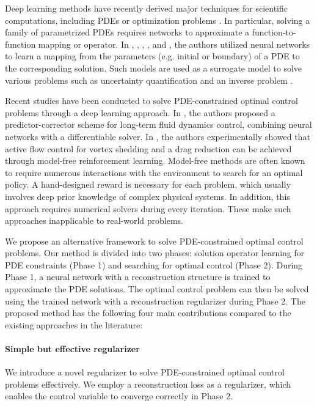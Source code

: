 \documentclass[letterpaper]{article}
\begin{document}
Deep learning methods have recently derived major techniques for scientific computations, including PDEs or optimization problems \cite{raissi2019physics}. In particular, solving a family of parametrized PDEs requires networks to approximate a function-to-function mapping or operator. In \cite{li2020fourier}, \cite{li2020neural}, \cite{lu2019deeponet}, \cite{ zhu2018bayesian}, and \cite{zhu2019physics}, the authors utilized neural networks to learn a mapping from the parameters (e.g. initial or boundary) of a PDE to the corresponding solution. Such models are used as a surrogate model to solve various problems such as uncertainty quantification \cite{zhu2018bayesian,zhu2019physics} and an inverse problem \cite{li2020fourier}.

Recent studies have been conducted to solve PDE-constrained optimal control problems through a deep learning approach. In \cite{holl2020learning}, the authors proposed a predictor-corrector scheme for long-term fluid dynamics control, combining neural networks with a differentiable solver. In \cite{rabault2019artificial}, the authors experimentally showed that active flow control for vortex shedding and a drag reduction can be achieved through model-free reinforcement learning. Model-free methods are often known to require numerous interactions with the environment to search for an optimal policy. A hand-designed reward is necessary for each problem, which usually involves deep prior knowledge of complex physical systems. In addition, this approach requires numerical solvers during every iteration. These make such approaches inapplicable to real-world problems. 

We propose an alternative framework to solve PDE-constrained optimal control problems. Our method is divided into two phases: solution operator learning for PDE constraints (Phase 1) and searching for optimal control (Phase 2). During Phase 1, a neural network with a reconstruction structure is trained to approximate the PDE solutions. The optimal control problem can then be solved using the trained network with a reconstruction regularizer during Phase 2.
 The proposed method has the following four main contributions compared to the existing approaches in the literature:

\paragraph{Simple but effective regularizer}We introduce a novel regularizer to solve PDE-constrained optimal control problems effectively. We employ a reconstruction loss as a regularizer, which enables the control variable to converge correctly in Phase 2.
\end{document}
